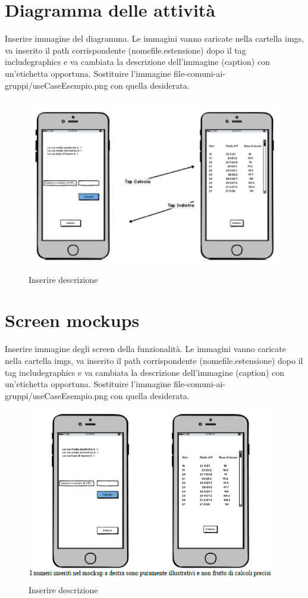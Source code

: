 \section{Diagramma delle attività}

Inserire immagine del diagramma. Le immagini vanno caricate nella cartella imgs, va inserito il path corrispondente (nomefile.estensione) dopo il tag includegraphics e va cambiata la descrizione dell'immagine (caption) con un'etichetta opportuna. Sostituire l'immagine file-comuni-ai-gruppi/useCaseEsempio.png con quella desiderata.

\begin{figure}
	\centering
	\includegraphics[height=3in,width=5in]{imgs/file-comuni-ai-gruppi/ActivityDgEsempio.png}
	\caption{Inserire descrizione}
	\label{fig:prova}
\end{figure}

\section{Screen mockups}

Inserire immagine degli screen della funzionalità. Le immagini vanno caricate nella cartella imgs, va inserito il path corrispondente (nomefile.estensione) dopo il tag includegraphics e va cambiata la descrizione dell'immagine (caption) con un'etichetta opportuna. Sostituire l'immagine file-comuni-ai-gruppi/useCaseEsempio.png con quella desiderata.

\begin{figure}
	\centering
	\includegraphics[height=3in]{imgs/file-comuni-ai-gruppi/MockupEsempio.png}
	\caption{Inserire descrizione}
	\label{fig:prova}
\end{figure}

\clearpage